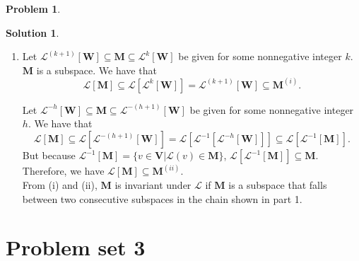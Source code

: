 \documentclass{book}
\theoremstyle{definition}
\newtheorem*{prob*}{Problem}
\newtheorem*{sln*}{Solution}
\newcommand{\V}{\mathbf{V}}
\newcommand{\W}{\mathbf{W}}
\newcommand{\lag}{\mathcal{L}}
\begin{document}
\begin{prob*}
\begin{sln*}
\begin{enumerate}
				
				
				
				
			\item	
			Let $\lag^{(k+1)}[\W] \subseteq \mathbf{M} \subseteq \lag^{k}[\W]$ be given for some nonnegative integer $k$. $\mathbf{M}$ is a subspace. We have that
			$$\lag[\mathbf{M}] \subseteq \lag[\lag^{k}[\W]] = \lag^{(k+1)}[\W] \subseteq \mathbf{M}^{(i)}. $$
			
			Let $\lag^{-h}[\mathbf{W}] \subseteq \mathbf{M} \subseteq \lag^{-(h+1)}[\W]$ be given for some nonnegative integer $h$. We have that
			$$ \lag[\mathbf{M}] \subseteq \lag[\lag^{-(h+1)}[\W]] = \lag[\lag^{-1}[\lag^{-h}[\W]]] \subseteq \lag[\lag^{-1}[\mathbf{M}]].  $$
			But because $\lag^{-1}[\mathbf{M}] = \{ v\in \V \vert \lag(v)\in \mathbf{M} \}$, $\lag[\lag^{-1}[\mathbf{M}]] \subseteq \mathbf{M}$. Therefore, we have $\lag[\mathbf{M}] \subseteq \mathbf{M}^{(ii)}$.\\ 
			
			From (i) and (ii), $\mathbf{M}$ is invariant under $\lag$ if $\mathbf{M}$ is a subspace that falls between two consecutive subspaces in the chain shown in part 1.
			
		\end{enumerate}
	\end{sln*}
\end{prob*}






































\newpage
\section{Problem set 3}
\end{document}
